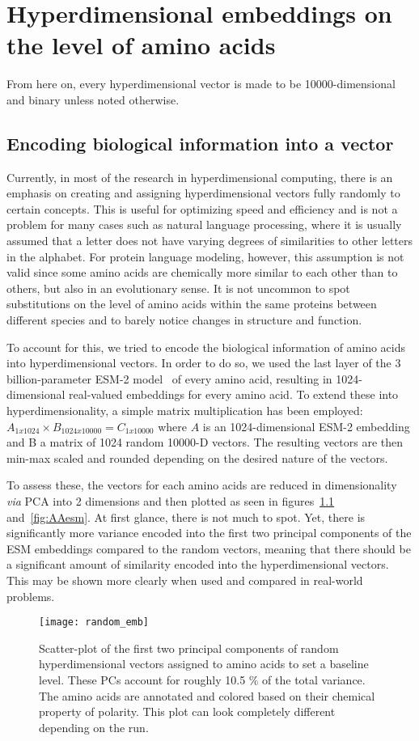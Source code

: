 \chapter{Hyperdimensional embeddings on the level of amino acids}
From here on, every hyperdimensional vector is made to be 10000-dimensional and binary unless noted otherwise.
\section{Encoding biological information into a vector}
Currently, in most of the research in hyperdimensional computing, there is an emphasis on creating and assigning hyperdimensional vectors fully randomly to certain concepts. This is useful for optimizing speed and efficiency and is not a problem for many cases such as natural language processing, where it is usually assumed that a letter does not have varying degrees of similarities to other letters in the alphabet. For protein language modeling, however, this assumption is not valid since some amino acids are chemically more similar to each other than to others, but also in an evolutionary sense. It is not uncommon to spot substitutions on the level of amino acids within the same proteins between different species and to barely notice changes in structure and function.

To account for this, we tried to encode the biological information of amino acids into hyperdimensional vectors. In order to do so, we used the last layer of the 3 billion-parameter ESM-2 model~\cite{esm2} of every amino acid, resulting in 1024-dimensional real-valued embeddings for every amino acid. To extend these into hyperdimensionality, a simple matrix multiplication has been employed: $A_{1x1024} \times B_{1024x10000} = C_{1x10000}$ where $A$ is an 1024-dimensional ESM-2 embedding and B a matrix of 1024 random 10000-D vectors. The resulting vectors are then min-max scaled and rounded depending on the desired nature of the vectors. 

To assess these, the vectors for each amino acids are reduced in dimensionality \textit{via} PCA into 2 dimensions and then plotted as seen in figures~\ref{fig:AArand} and~\ref{fig:AAesm}. At first glance, there is not much to spot. Yet, there is significantly more variance encoded into the first two principal components of the ESM embeddings compared to the random vectors, meaning that there should be a significant amount of similarity encoded into the hyperdimensional vectors. This may be shown more clearly when used and compared in real-world problems.
\begin{figure}[H]
    \centering
    \texttt{[image: random\_emb]}
    \caption{Scatter-plot of the first two principal components of random hyperdimensional vectors assigned to amino acids to set a baseline level. These PCs account for roughly 10.5 \% of the total variance. The amino acids are annotated and colored based on their chemical property of polarity. This plot can look completely different depending on the run.}\label{fig:AArand}
\end{figure}

